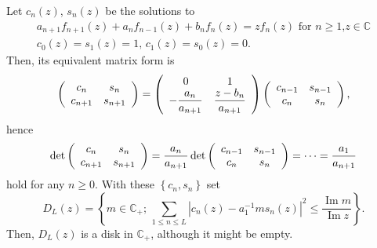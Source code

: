 \documentclass[a4paper]{article}%
\begin{document}
Let $c_{n}\left(  z\right)  $, $s_{n}(z)$ be the solutions to%
\begin{gather*}
a_{n+1}f_{n+1}\left(  z\right)  +a_{n}f_{n-1}\left(  z\right)  +b_{n}%
f_{n}\left(  z\right)  =zf_{n}\left(  z\right)  \text{ for }n\geq1\text{,
}z\in\mathbb{C}\\
c_{0}\left(  z\right)  =s_{1}\left(  z\right)  =1\text{, \ }c_{1}\left(
z\right)  =s_{0}\left(  z\right)  =0\text{.}%
\end{gather*}
Then, its equivalent matrix form is%
\[
\left(
\begin{array}
[c]{cc}%
c_{n} & s_{n}\\
c_{n+1} & s_{n+1}%
\end{array}
\right)  =\left(
\begin{array}
[c]{cc}%
0 & 1\\
-\dfrac{a_{n}}{a_{n+1}} & \dfrac{z-b_{n}}{a_{n+1}}%
\end{array}
\right)  \left(
\begin{array}
[c]{cc}%
c_{n-1} & s_{n-1}\\
c_{n} & s_{n}%
\end{array}
\right)  \text{,}%
\]
hence%
\begin{equation}
\det\left(
\begin{array}
[c]{cc}%
c_{n} & s_{n}\\
c_{n+1} & s_{n+1}%
\end{array}
\right)  =\dfrac{a_{n}}{a_{n+1}}\det\left(
\begin{array}
[c]{cc}%
c_{n-1} & s_{n-1}\\
c_{n} & s_{n}%
\end{array}
\right)  =\cdots=\dfrac{a_{1}}{a_{n+1}} \label{a1}%
\end{equation}
hold for any $n\geq0$. With these $\left\{  c_{n},s_{n}\right\}  $ set%
\[
D_{L}(z)=\left\{  m\in\mathbb{C}_{+}\text{; }\sum_{1\leq n\leq L}\left\vert
c_{n}(z)-a_{1}^{-1}ms_{n}(z)\right\vert ^{2}\leq\dfrac{\operatorname{Im}%
m}{\operatorname{Im}z}\right\}  \text{.}%
\]
Then, $D_{L}(z)$ is a disk in $\mathbb{C}_{+}$, although it might be empty.
\end{document}
